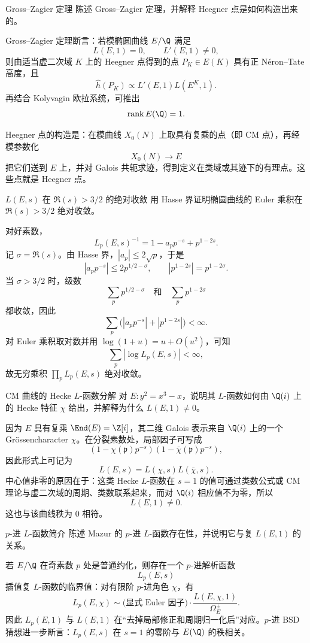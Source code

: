 \begin{problem}{Gross--Zagier 定理 \medium}
陈述 Gross--Zagier 定理，并解释 Heegner 点是如何构造出来的。
\end{problem}
\begin{solution}
Gross--Zagier 定理断言：若模椭圆曲线 $E/\Q$ 满足
\[
L(E,1)=0,
\qquad
L'(E,1)\neq 0,
\]
则由适当虚二次域 $K$ 上的 Heegner 点得到的点 $P_K\in E(K)$ 具有正 Néron--Tate 高度，且
\[
\hat h(P_K)\propto L'(E,1)L(E^K,1).
\]
再结合 Kolyvagin 欧拉系统，可推出
\[
\mathrm{rank}\,E(\Q)=1.
\]

Heegner 点的构造是：在模曲线 $X_0(N)$ 上取具有复乘的点（即 CM 点），再经模参数化
\[
X_0(N)\to E
\]
把它们送到 $E$ 上，并对 Galois 共轭求迹，得到定义在类域或其迹下的有理点。这些点就是 Heegner 点。
\end{solution}

\begin{problem}{$L(E,s)$ 在 $\Re(s)>3/2$ 的绝对收敛 \medium}
用 Hasse 界证明椭圆曲线的 Euler 乘积在 $\Re(s)>3/2$ 绝对收敛。
\end{problem}
\begin{solution}
对好素数，
\[
L_p(E,s)^{-1}=1-a_pp^{-s}+p^{1-2s}.
\]
记 $\sigma=\Re(s)$。由 Hasse 界，$|a_p|\le 2\sqrt p$，于是
\[
|a_pp^{-s}|\le 2p^{1/2-\sigma},
\qquad
|p^{1-2s}|=p^{1-2\sigma}.
\]
当 $\sigma>3/2$ 时，级数
\[
\sum_p p^{1/2-\sigma}
\quad\text{和}\quad
\sum_p p^{1-2\sigma}
\]
都收敛，因此
\[
\sum_p\bigl(|a_pp^{-s}|+|p^{1-2s}|\bigr)<\infty.
\]
对 Euler 乘积取对数并用 $\log(1+u)=u+O(u^2)$，可知
\[
\sum_p |\log L_p(E,s)|<\infty,
\]
故无穷乘积 $\prod_pL_p(E,s)$ 绝对收敛。
\end{solution}

\begin{problem}{CM 曲线的 Hecke $L$-函数分解 \medium}
对 $E:y^2=x^3-x$，说明其 $L$-函数如何由 $\Q(i)$ 上的 Hecke 特征 $\chi$ 给出，并解释为什么 $L(E,1)\neq 0$。
\end{problem}
\begin{solution}
因为 $E$ 具有复乘 $\End(E)=\Z[i]$，其二维 Galois 表示来自 $\Q(i)$ 上的一个 Grössencharacter $\chi$。在分裂素数处，局部因子可写成
\[
(1-\chi(\mathfrak p)p^{-s})(1-\bar\chi(\mathfrak p)p^{-s}),
\]
因此形式上可记为
\[
L(E,s)=L(\chi,s)L(\bar\chi,s).
\]
中心值非零的原因在于：这类 Hecke $L$-函数在 $s=1$ 的值可通过类数公式或 CM 理论与虚二次域的周期、类数联系起来，而对 $\Q(i)$ 相应值不为零，所以
\[
L(E,1)\neq 0.
\]
这也与该曲线秩为 $0$ 相符。
\end{solution}

\begin{problem}{$p$-进 $L$-函数简介 \medium}
陈述 Mazur 的 $p$-进 $L$-函数存在性，并说明它与复 $L(E,1)$ 的关系。
\end{problem}
\begin{solution}
若 $E/\Q$ 在奇素数 $p$ 处是普通约化，则存在一个 $p$-进解析函数
\[
L_p(E,s)
\]
插值复 $L$-函数的临界值：对有限阶 $p$-进角色 $\chi$，有
\[
L_p(E,\chi)\sim \text{(显式 Euler 因子)}\cdot \frac{L(E,\chi,1)}{\Omega_E^{\pm}}.
\]
因此 $L_p(E,1)$ 与 $L(E,1)$ 在“去掉局部修正和周期归一化后”对应。$p$-进 BSD 猜想进一步断言：$L_p(E,s)$ 在 $s=1$ 的零阶与 $E(\Q)$ 的秩相关。
\end{solution}

